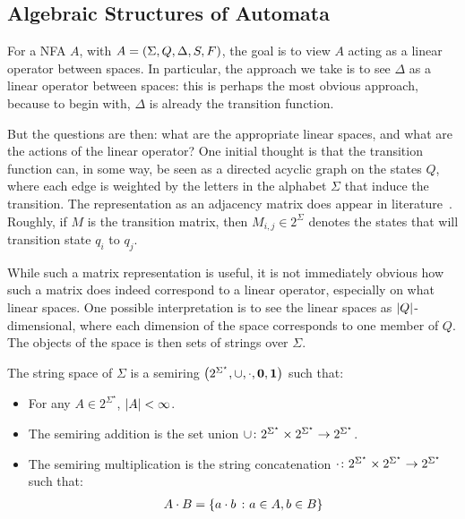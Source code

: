 \documentclass[12pt]{article}
\begin{document}
\subsection{Algebraic Structures of Automata}

For a NFA \(A\), with \(A = \left(\Sigma, Q, \Delta, S, F\right)\),
the goal is to view \(A\) acting as a linear operator between spaces.
In particular, the approach we take is to see \(\Delta\) as a
linear operator between spaces: this is perhaps the most obvious approach,
because to begin with, \(\Delta\) is already the transition function.

But the questions are then:
what are the appropriate linear spaces,
and what are the actions of the linear operator?
One initial thought is that the transition function can, in some way,
be seen as a directed acyclic graph on the states \(Q\),
where each edge is weighted by the letters in the alphabet \(\Sigma\)
that induce the transition.
The representation as an adjacency matrix does appear in
literature~\cite{savage1998models}.
Roughly, if \(M\) is the transition matrix, then \(M_{i, j} \in 2^{\Sigma}\)
denotes the states that will transition state \(q_i\) to \(q_j\).

While such a matrix representation is useful,
it is not immediately obvious how such a matrix does indeed correspond
to a linear operator, especially on what linear spaces.
One possible interpretation is to see
the linear spaces as \(\left\lvert Q\right\rvert\)-dimensional,
where each dimension of the space corresponds to one member of \(Q\).
The objects of the space is then sets of strings over \(\Sigma\).

\begin{definition}
  The string space of \(\Sigma\) is a semiring
  \(\left(2^{\Sigma^\star}, \cup, \cdot, \mathbf{0}, \mathbf{1}\right)\)
  such that:
  \begin{itemize}
    \item
      For any \(A \in 2^{\Sigma^\star}\), \(\left\lvert A\right\rvert < \infty\).
    \item
      The semiring addition is the set union
      \(\cup \colon 2^{\Sigma^\star} \times
        2^{\Sigma^\star} \to 2^{\Sigma^\star}\).

    \item
      The semiring multiplication is the string concatenation
      \(\cdot \colon 2^{\Sigma^\star} \times
        2^{\Sigma^\star} \to 2^{\Sigma^\star}\)
      such that:
      \begin{align*}
        A \cdot B
          = \left\{a \cdot b \ \colon a \in A, b \in B\right\}
      \end{align*}
  \end{itemize}
\end{definition}
\end{document}
